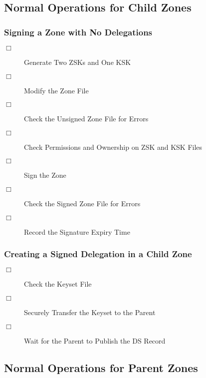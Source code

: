 
\clearpage
\subsection{Normal Operations for Child Zones}



\subsubsection{Signing a Zone with No Delegations}

\begin{description}
\item [$\Box$] Generate Two ZSKs and One KSK
\item [$\Box$] Modify the Zone File
\item [$\Box$] Check the Unsigned Zone File for Errors
\item [$\Box$] Check Permissions and Ownership on ZSK and KSK Files
\item [$\Box$] Sign the Zone
\item [$\Box$] Check the Signed Zone File for Errors
\item [$\Box$] Record the Signature Expiry Time
\end{description}


\subsubsection{Creating a Signed Delegation in a Child Zone}

\begin{description}
\item [$\Box$] Check the Keyset File
\item [$\Box$] Securely Transfer the Keyset to the Parent
\item [$\Box$] Wait for the Parent to Publish the DS Record
\end{description}


\clearpage
\subsection{Normal Operations for Parent Zones}



